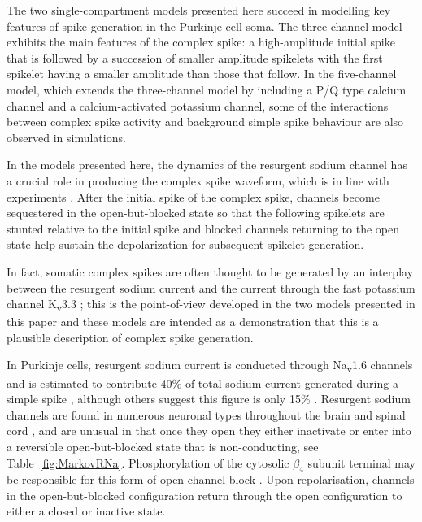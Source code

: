 \documentclass[utf8]{frontiersSCNS} %
\begin{document}
The two single-compartment models presented here succeed in modelling
key features of spike generation in the Purkinje cell soma. The
three-channel model exhibits the main features of the complex spike: a
high-amplitude initial spike that is followed by a succession of
smaller amplitude spikelets with the first spikelet having a smaller
amplitude than those that follow. In the five-channel model, which
extends the three-channel model by including a P/Q type calcium
channel and a calcium-activated potassium channel, some of the
interactions between complex spike activity and background simple
spike behaviour are also observed in simulations.

In the models presented here, the dynamics of the resurgent sodium
channel has a crucial role in producing the complex spike waveform,
which is in line with experiments \cite{RamanBean1997}. After the
initial spike of the complex spike, channels become sequestered in the
open-but-blocked state so that the following spikelets are stunted
relative to the initial spike and blocked channels returning to the
open state help sustain the depolarization for subsequent spikelet
generation.

In fact, somatic complex spikes are often thought to be generated by
an interplay between the resurgent sodium current
\cite{RamanBean1997,RamanBean2001,KhaliqEtAl2003,KhaliqRaman2006} and
the current through the fast potassium channel K\textsubscript{v}3.3
\cite{ZaghaEtAl2008,HurlockEtAl2008,VeysEtAl2013}; this is the
point-of-view developed in the two models presented in this paper and
these models are intended as a demonstration that this is a plausible
description of complex spike generation.

In Purkinje cells, resurgent sodium current is conducted through
Na\textsubscript{v}1.6 channels \cite{RamanBean1997} and is estimated
to contribute 40\% of total sodium current generated during a simple
spike \cite{RamanBean2001}, although others suggest this figure is
only 15\% \cite{LevinEtAl2006}. Resurgent sodium channels are found in
numerous neuronal types throughout the brain and spinal cord
\cite{OsorioEtAl2010}, and are unusual in that once they open they
either inactivate or enter into a reversible open-but-blocked state
that is non-conducting, see Table~\ref{fig:MarkovRNa}. Phosphorylation
of the cytosolic $\beta_4$ subunit terminal may be responsible for
this form of open channel block \cite{GriecoEtAl2002}. Upon
repolarisation, channels in the open-but-blocked configuration return
through the open configuration to either a closed or inactive state.
\end{document}
